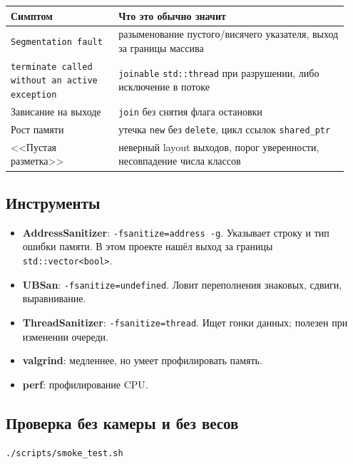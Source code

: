 \documentclass[11pt,a4paper]{article}
\theoremstyle{definition}
\theoremstyle{remark}
\begin{document}
\begin{center}
\begin{tabular}{p{0.30\linewidth}p{0.64\linewidth}}
\toprule
Симптом & Что это обычно значит \\
\midrule
\texttt{Segmentation fault} & разыменование пустого/висячего указателя,
                              выход за границы массива \\
\texttt{terminate called without an active exception} & \texttt{joinable}
        \texttt{std::thread} при разрушении, либо исключение в потоке \\
Зависание на выходе & \texttt{join} без снятия флага остановки \\
Рост памяти & утечка \texttt{new} без \texttt{delete}, цикл ссылок
              \texttt{shared\_ptr} \\
<<Пустая разметка>> & неверный layout выходов, порог уверенности,
        несовпадение числа классов \\
\bottomrule
\end{tabular}
\end{center}

\subsection{Инструменты}

\begin{itemize}
  \item \textbf{AddressSanitizer}: \texttt{-fsanitize=address -g}. Указывает
        строку и тип ошибки памяти. В этом проекте нашёл выход за границы
        \texttt{std::vector<bool>}.
  \item \textbf{UBSan}: \texttt{-fsanitize=undefined}. Ловит переполнения
        знаковых, сдвиги, выравнивание.
  \item \textbf{ThreadSanitizer}: \texttt{-fsanitize=thread}. Ищет гонки
        данных; полезен при изменении очереди.
  \item \textbf{valgrind}: медленнее, но умеет профилировать память.
  \item \textbf{perf}: профилирование CPU.
\end{itemize}

\subsection{Проверка без камеры и без весов}

\begin{lstlisting}[style=shell]
./scripts/smoke_test.sh
\end{lstlisting}
\end{document}
